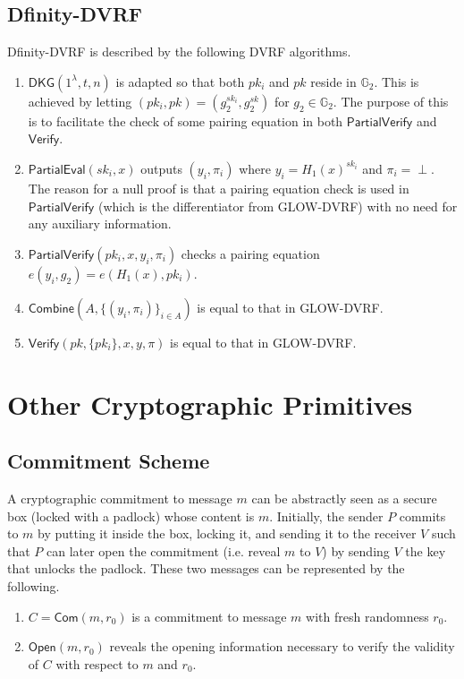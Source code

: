 \documentclass[letterpaper,twocolumn,10pt]{article}
\theoremstyle{definition}
\theoremstyle{remark}
\begin{document}
\subsection{Dfinity-DVRF}
\label{appendix:dfinity-dvrf}
Dfinity-DVRF is described by the following DVRF algorithms.
\begin{enumerate}
\item $\mathsf{DKG}(1^\lambda, t, n)$ is adapted so that both $pk_i$ and $pk$ reside in $\mathbb{G}_2$. This is achieved by letting $(pk_i, pk) = (g_2^{sk_i}, g_2^{sk})$ for $g_2 \in \mathbb{G}_2$. The purpose of this is to facilitate the check of some pairing equation in both $\mathsf{PartialVerify}$ and $\mathsf{Verify}$.
\item $\mathsf{PartialEval}(sk_i, x)$ outputs $(y_i, \pi_i)$ where $y_i = H_1(x)^{sk_i}$ and $\pi_i = \text{$\perp$}$. The reason for a null proof is that a pairing equation check is used in $\mathsf{PartialVerify}$ (which is the differentiator from GLOW-DVRF) with no need for any auxiliary information.
\item $\mathsf{PartialVerify}(pk_i, x, y_i, \pi_i)$ checks a pairing equation $e(y_i, g_2) = e(H_1(x), pk_i)$.
\item $\mathsf{Combine}(A, \{(y_i, \pi_i)\}_{i \in A})$ is equal to that in GLOW-DVRF.
\item $\mathsf{Verify}(pk, \{pk_i\}, x, y, \pi)$ is equal to that in GLOW-DVRF.
\end{enumerate}

\section{Other Cryptographic Primitives}
\iffalse
\subsection{Commitment Scheme}
\label{appendix:commitment}
A cryptographic commitment \cite{blum1983coin} to message $m$ can be abstractly seen as a secure box (locked with a padlock) whose content is $m$. Initially, the sender $P$ commits to $m$ by putting it inside the box, locking it, and sending it to the receiver $V$ such that $P$ can later open the commitment (i.e. reveal $m$ to $V$) by sending $V$ the key that unlocks the padlock. These two messages can be represented by the following.
\begin{enumerate}
\item $C = \mathsf{Com}(m, r_0)$ is a commitment to message $m$ with fresh randomness $r_0$.
\item $\mathsf{Open}(m, r_0)$ reveals the opening information necessary to verify the validity of $C$ with respect to $m$ and $r_0$.
\end{enumerate}
\end{document}
